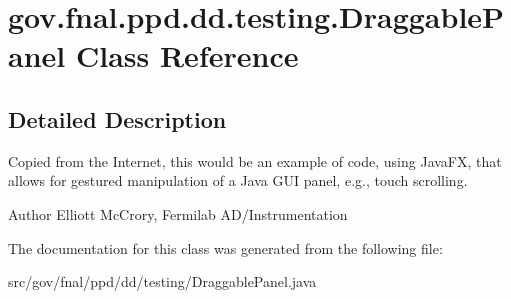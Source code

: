 \hypertarget{classgov_1_1fnal_1_1ppd_1_1dd_1_1testing_1_1DraggablePanel}{\section{gov.\-fnal.\-ppd.\-dd.\-testing.\-Draggable\-Panel Class Reference}
\label{classgov_1_1fnal_1_1ppd_1_1dd_1_1testing_1_1DraggablePanel}
}


\subsection{Detailed Description}
Copied from the Internet, this would be an example of code, using Java\-F\-X, that allows for gestured manipulation of a Java G\-U\-I panel, e.\-g., touch scrolling.

\begin{DoxyAuthor}{Author}
Elliott Mc\-Crory, Fermilab A\-D/\-Instrumentation 
\end{DoxyAuthor}


The documentation for this class was generated from the following file\-:\begin{DoxyCompactItemize}
\item 
src/gov/fnal/ppd/dd/testing/Draggable\-Panel.\-java\end{DoxyCompactItemize}
